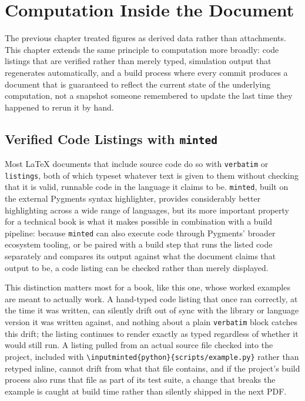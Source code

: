 \hypertarget{chapter-15-computation-inside-the-document}{%
\chapter{Computation Inside the Document}\label{chapter-15-computation-inside-the-document}}

The previous chapter treated figures as derived data rather than attachments. This chapter extends the same principle to computation more broadly: code listings that are verified rather than merely typed, simulation output that regenerates automatically, and a build process where every commit produces a document that is guaranteed to reflect the current state of the underlying computation, not a snapshot someone remembered to update the last time they happened to rerun it by hand.

\hypertarget{verified-code-listings-with-minted}{%
\section{\texorpdfstring{Verified Code Listings with \texttt{minted}}{Verified Code Listings with minted}}\label{verified-code-listings-with-minted}}

Most LaTeX documents that include source code do so with \texttt{verbatim} or \texttt{listings}, both of which typeset whatever text is given to them without checking that it is valid, runnable code in the language it claims to be. \texttt{minted}, built on the external Pygments syntax highlighter, provides considerably better highlighting across a wide range of languages, but its more important property for a technical book is what it makes possible in combination with a build pipeline: because \texttt{minted} can also execute code through Pygments' broader ecosystem tooling, or be paired with a build step that runs the listed code separately and compares its output against what the document claims that output to be, a code listing can be checked rather than merely displayed.

This distinction matters most for a book, like this one, whose worked examples are meant to actually work. A hand-typed code listing that once ran correctly, at the time it was written, can silently drift out of sync with the library or language version it was written against, and nothing about a plain \texttt{verbatim} block catches this drift; the listing continues to render exactly as typed regardless of whether it would still run. A listing pulled from an actual source file checked into the project, included with \texttt{\textbackslash{}inputminted\{python\}\{scripts/example.py\}} rather than retyped inline, cannot drift from what that file contains, and if the project's build process also runs that file as part of its test suite, a change that breaks the example is caught at build time rather than silently shipped in the next PDF.

